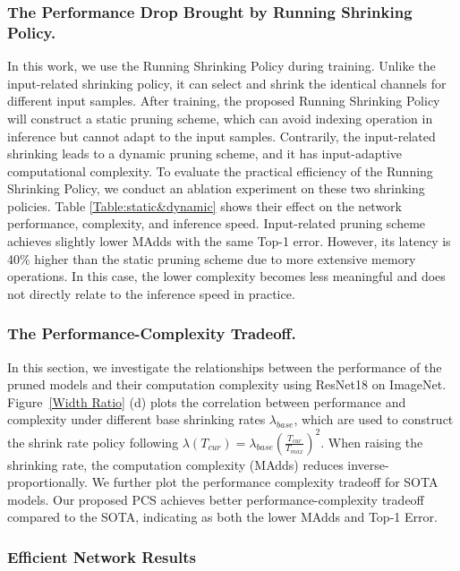 \documentclass[lettersize,journal]{IEEEtran}
\begin{document}
\subsubsection{The Performance Drop Brought by Running Shrinking Policy.}
In this work, we use the Running Shrinking Policy during training. Unlike the input-related shrinking policy, it can select and shrink the identical channels for different input samples. After training, the proposed Running Shrinking Policy will construct a static pruning scheme, which can avoid indexing operation in inference but cannot adapt to the input samples. Contrarily, the input-related shrinking leads to a dynamic pruning scheme, and it has input-adaptive computational complexity. To evaluate the practical efficiency of the Running Shrinking Policy, we conduct an ablation experiment on these two shrinking policies. Table \ref{Table:static&dynamic} shows their effect on the network performance, complexity, and inference speed. Input-related pruning scheme achieves slightly lower MAdds with the same Top-1 error. However, its latency is 40\% higher than the static pruning scheme due to more extensive memory operations. In this case, the lower complexity becomes less meaningful and does not directly relate to the inference speed in practice. 

\subsubsection{The Performance-Complexity Tradeoff.}
In this section, we investigate the relationships between the performance of the pruned models and their computation complexity using ResNet18 on ImageNet. Figure~\ref{Width Ratio} (d) plots the correlation between performance and complexity under different base shrinking rates $\lambda_{base}$, which are used to construct the shrink rate policy following $\lambda(T_{cur})=\lambda_{base}(\frac{T_{cur}}{T_{max}})^2$. When raising the shrinking rate, the computation complexity (MAdds) reduces inverse-proportionally. We further plot the performance complexity tradeoff for SOTA models.  
Our proposed PCS achieves better performance-complexity tradeoff compared to the SOTA, indicating as both the lower MAdds and Top-1 Error. 



\subsubsection{Efficient Network Results}
\end{document}
